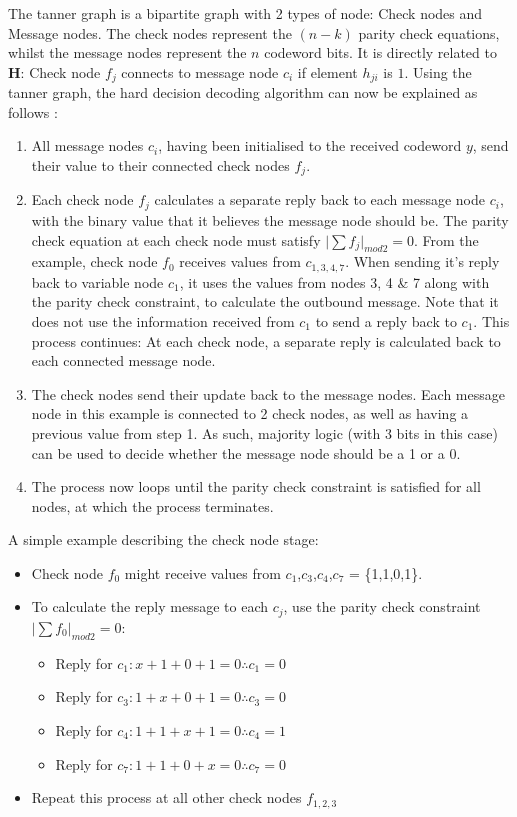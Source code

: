 \documentclass[11pt]{article}
\numberwithin{equation}{subsection}
\begin{document}
The tanner graph is a bipartite graph with 2 types of node: Check nodes and Message nodes. The check nodes represent the $(n-k)$ parity check equations, whilst the message nodes represent the $n$ codeword bits. It is directly related to $\mathbf{H}$: Check node $f_j$ connects to message node $c_i$ if element $h_{ji}$ is $1$. Using the tanner graph, the hard decision decoding algorithm can now be explained as follows \cite{ldpc-tutorial1}:
\begin{enumerate}
\item All message nodes $c_i$, having been initialised to the received codeword $y$, send their value to their connected check nodes $f_j$.
\item Each check node $f_j$ calculates a separate reply back to each message node $c_i$, with the binary value that it believes the message node should be. The parity check equation at each check node must satisfy $\lvert \sum f_j \rvert_{mod2} = 0$. From the example, check node $f_0$ receives values from $c_{1,3,4,7}$. When sending it's reply back to variable node $c_1$, it uses the values from nodes 3, 4 \& 7 along with the parity check constraint, to calculate the outbound message. Note that it does not use the information received from $c_1$ to send a reply back to $c_1$. This process continues: At each check node, a separate reply is calculated back to each connected message node.
\item The check nodes send their update back to the message nodes. Each message node in this example is connected to 2 check nodes, as well as having a previous value from step 1. As such, majority logic (with 3 bits in this case) can be used to decide whether the message node should be a 1 or a 0. 
\item The process now loops until the parity check constraint is satisfied for all nodes, at which the process terminates.
\end{enumerate}

\noindent A simple example describing the check node stage:
\begin{itemize}
\item Check node $f_0$ might receive values from $c_1$,$c_3$,$c_4$,$c_7$ = \{1,1,0,1\}.
\item To calculate the reply message to each $c_j$, use the parity check constraint $\lvert \sum f_0 \rvert_{mod2} = 0$:
\begin{itemize}
\item Reply for $c_1 : x + 1 + 0 + 1 = 0 \therefore c_1 = 0$ 
\item Reply for $c_3 : 1 + x + 0 + 1 = 0 \therefore c_3 = 0$ 
\item Reply for $c_4 : 1 + 1 + x + 1 = 0 \therefore c_4 = 1$ 
\item Reply for $c_7 : 1 + 1 + 0 + x = 0 \therefore c_7 = 0$
\end{itemize}
\item Repeat this process at all other check nodes $f_{1,2,3}$
\end{itemize}
\end{document}
